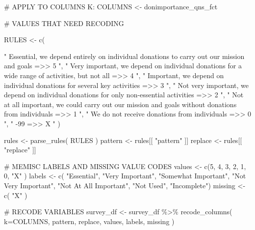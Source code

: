 \documentclass[
  letterpaper,
]{scrbook}
\newenvironment{Shaded}{\begin{snugshade}}{\end{snugshade}}
\newcommand{\AttributeTok}[1]{\textcolor[rgb]{0.40,0.45,0.13}{#1}}
\newcommand{\CommentTok}[1]{\textcolor[rgb]{0.37,0.37,0.37}{#1}}
\newcommand{\DecValTok}[1]{\textcolor[rgb]{0.68,0.00,0.00}{#1}}
\newcommand{\FunctionTok}[1]{\textcolor[rgb]{0.28,0.35,0.67}{#1}}
\newcommand{\NormalTok}[1]{\textcolor[rgb]{0.00,0.23,0.31}{#1}}
\newcommand{\OtherTok}[1]{\textcolor[rgb]{0.00,0.23,0.31}{#1}}
\newcommand{\SpecialCharTok}[1]{\textcolor[rgb]{0.37,0.37,0.37}{#1}}
\newcommand{\StringTok}[1]{\textcolor[rgb]{0.13,0.47,0.30}{#1}}
\begin{document}
\begin{Shaded}
\begin{Highlighting}[]
\CommentTok{\# APPLY TO COLUMNS K:}
\NormalTok{COLUMNS }\OtherTok{\textless{}{-}}\NormalTok{  donimportance\_qns\_fct}

\CommentTok{\# VALUES THAT NEED RECODING}

\NormalTok{RULES }\OtherTok{\textless{}{-}} \FunctionTok{c}\NormalTok{(    }

  \StringTok{"          Essential, we depend entirely on individual donations to carry out our mission and goals  =\textgreater{}\textgreater{}  5  "}\NormalTok{,}
  \StringTok{"     Very important, we depend on individual donations for a wide range of activities, but not all  =\textgreater{}\textgreater{}  4  "}\NormalTok{,}
  \StringTok{"                           Important, we depend on individual donations for several key activities  =\textgreater{}\textgreater{}  3  "}\NormalTok{,}
  \StringTok{"           Not very important, we depend on individual donations for only non{-}essential activities  =\textgreater{}\textgreater{}  2  "}\NormalTok{,}
  \StringTok{" Not at all important, we could carry out our mission and goals without donations from individuals  =\textgreater{}\textgreater{}  1  "}\NormalTok{,}
  \StringTok{"                                                      We do not receive donations from individuals  =\textgreater{}\textgreater{}  0  "}\NormalTok{,}
  \StringTok{"                                                                                               {-}99  =\textgreater{}\textgreater{}  X  "}\NormalTok{  )}


\NormalTok{rules }\OtherTok{\textless{}{-}} \FunctionTok{parse\_rules}\NormalTok{( RULES )          }
\NormalTok{pattern }\OtherTok{\textless{}{-}}\NormalTok{ rules[[ }\StringTok{"pattern"}\NormalTok{ ]]}
\NormalTok{replace }\OtherTok{\textless{}{-}}\NormalTok{ rules[[ }\StringTok{"replace"}\NormalTok{ ]]}

\CommentTok{\# MEMISC LABELS AND MISSING VALUE CODES }
\NormalTok{values  }\OtherTok{\textless{}{-}} \FunctionTok{c}\NormalTok{(}\DecValTok{5}\NormalTok{, }\DecValTok{4}\NormalTok{, }\DecValTok{3}\NormalTok{, }\DecValTok{2}\NormalTok{, }\DecValTok{1}\NormalTok{, }\DecValTok{0}\NormalTok{, }\StringTok{"X"}\NormalTok{ )}
\NormalTok{labels  }\OtherTok{\textless{}{-}} \FunctionTok{c}\NormalTok{( }\StringTok{"Essential"}\NormalTok{, }\StringTok{"Very Important"}\NormalTok{, }
              \StringTok{"Somewhat Important"}\NormalTok{, }\StringTok{"Not Very Important"}\NormalTok{, }
              \StringTok{"Not At All Important"}\NormalTok{, }\StringTok{"Not Used"}\NormalTok{, }\StringTok{"Incomplete"}\NormalTok{)}
\NormalTok{missing }\OtherTok{\textless{}{-}} \FunctionTok{c}\NormalTok{( }\StringTok{"X"}\NormalTok{ )}

\CommentTok{\# RECODE VARIABLES }
\NormalTok{survey\_df }\OtherTok{\textless{}{-}} 
\NormalTok{  survey\_df }\SpecialCharTok{\%\textgreater{}\%} 
  \FunctionTok{recode\_columns}\NormalTok{( }\AttributeTok{k=}\NormalTok{COLUMNS, pattern, replace, values, labels, missing )}
\end{Highlighting}
\end{Shaded}
\end{document}

